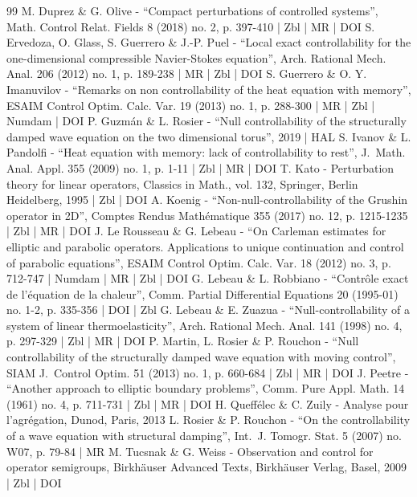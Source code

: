 \documentclass[10pt]{amsart}
\theoremstyle{plain}
\theoremstyle{definition}
\theoremstyle{remark}
\begin{document}
\begin{thebibliography}{99}
M. Duprez \& G. Olive - “Compact perturbations of controlled systems”, Math. Control Relat. Fields 8 (2018) no. 2, p. 397-410 | Zbl | MR | DOI
S. Ervedoza, O. Glass, S. Guerrero \& J.-P. Puel - “Local exact controllability for the one-dimensional compressible Navier-Stokes equation”, Arch. Rational Mech. Anal. 206 (2012) no. 1, p. 189-238 | MR | Zbl | DOI
S. Guerrero \& O. Y. Imanuvilov - “Remarks on non controllability of the heat equation with memory”, ESAIM Control Optim. Calc. Var. 19 (2013) no. 1, p. 288-300 | MR | Zbl | Numdam | DOI
P. Guzmán \& L. Rosier - “Null controllability of the structurally damped wave equation on the two dimensional torus”, 2019 | HAL
S. Ivanov \& L. Pandolfi - “Heat equation with memory: lack of controllability to rest”, J. Math. Anal. Appl. 355 (2009) no. 1, p. 1-11 | Zbl | MR | DOI
T. Kato - Perturbation theory for linear operators, Classics in Math., vol. 132, Springer, Berlin Heidelberg, 1995 | Zbl | DOI
A. Koenig - “Non-null-controllability of the Grushin operator in 2D”, Comptes Rendus Mathématique 355 (2017) no. 12, p. 1215-1235 | Zbl | MR | DOI
J. Le Rousseau \& G. Lebeau - “On Carleman estimates for elliptic and parabolic operators. Applications to unique continuation and control of parabolic equations”, ESAIM Control Optim. Calc. Var. 18 (2012) no. 3, p. 712-747 | Numdam | MR | Zbl | DOI
G. Lebeau \& L. Robbiano - “Contrôle exact de l’équation de la chaleur”, Comm. Partial Differential Equations 20 (1995-01) no. 1-2, p. 335-356 | DOI | Zbl
G. Lebeau \& E. Zuazua - “Null-controllability of a system of linear thermoelasticity”, Arch. Rational Mech. Anal. 141 (1998) no. 4, p. 297-329 | Zbl | MR | DOI
P. Martin, L. Rosier \& P. Rouchon - “Null controllability of the structurally damped wave equation with moving control”, SIAM J. Control Optim. 51 (2013) no. 1, p. 660-684 | Zbl | MR | DOI
J. Peetre - “Another approach to elliptic boundary problems”, Comm. Pure Appl. Math. 14 (1961) no. 4, p. 711-731 | Zbl | MR | DOI
H. Queffélec \& C. Zuily - Analyse pour l’agrégation, Dunod, Paris, 2013
L. Rosier \& P. Rouchon - “On the controllability of a wave equation with structural damping”, Int. J. Tomogr. Stat. 5 (2007) no. W07, p. 79-84 | MR
M. Tucsnak \& G. Weiss - Observation and control for operator semigroups, Birkhäuser Advanced Texts, Birkhäuser Verlag, Basel, 2009 | Zbl | DOI
\end{thebibliography}
\end{document}
